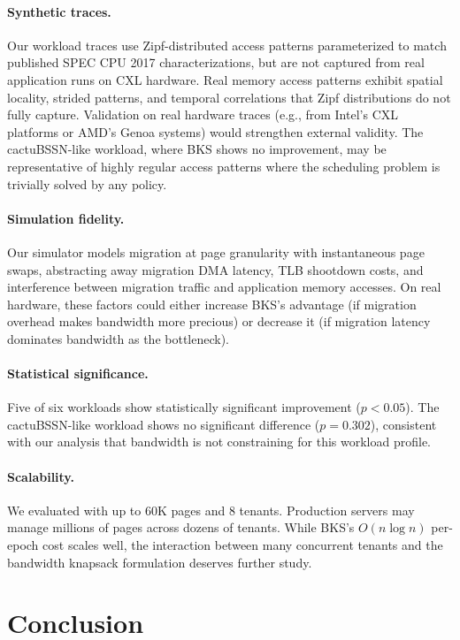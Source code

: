 \documentclass{article}
\begin{document}
\paragraph{Synthetic traces.} Our workload traces use Zipf-distributed access patterns parameterized to match published SPEC CPU 2017 characterizations, but are not captured from real application runs on CXL hardware. Real memory access patterns exhibit spatial locality, strided patterns, and temporal correlations that Zipf distributions do not fully capture. Validation on real hardware traces (e.g., from Intel's CXL platforms or AMD's Genoa systems) would strengthen external validity. The cactuBSSN-like workload, where BKS shows no improvement, may be representative of highly regular access patterns where the scheduling problem is trivially solved by any policy.

\paragraph{Simulation fidelity.} Our simulator models migration at page granularity with instantaneous page swaps, abstracting away migration DMA latency, TLB shootdown costs, and interference between migration traffic and application memory accesses. On real hardware, these factors could either increase BKS's advantage (if migration overhead makes bandwidth more precious) or decrease it (if migration latency dominates bandwidth as the bottleneck).

\paragraph{Statistical significance.} Five of six workloads show statistically significant improvement ($p < 0.05$). The cactuBSSN-like workload shows no significant difference ($p = 0.302$), consistent with our analysis that bandwidth is not constraining for this workload profile.

\paragraph{Scalability.} We evaluated with up to 60K pages and 8 tenants. Production servers may manage millions of pages across dozens of tenants. While BKS's $O(n \log n)$ per-epoch cost scales well, the interaction between many concurrent tenants and the bandwidth knapsack formulation deserves further study.

\section{Conclusion}
\label{sec:conclusion}
\end{document}
